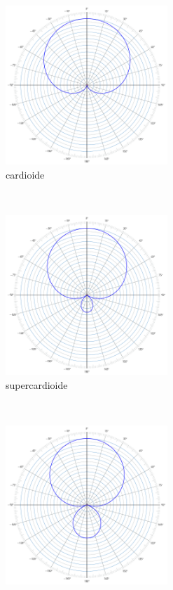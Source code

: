 \begin{figure}[h]
\begin{subfigure}[t]{0.48\textwidth}
        \label{pol:sub-p}
    \end{subfigure}
    \\
    \begin{subfigure}[t]{0.48\textwidth}
        \centering
        \includegraphics[height=6cm]{CAPITOLI/_TIKZ/POLAR/cardioid}
        \caption{cardioide}%
        \label{pol:cardio-p}
    \end{subfigure}
    ~
    \begin{subfigure}[t]{0.48\textwidth}
        \centering
        \includegraphics[height=6cm]{CAPITOLI/_TIKZ/POLAR/supercardioid}
        \caption{supercardioide}%
        \label{pol:super-p}
    \end{subfigure}
    \\
    \begin{subfigure}[t]{0.48\textwidth}
        \centering
        \includegraphics[height=6cm]{CAPITOLI/_TIKZ/POLAR/hypercardioid}

\end{subfigure}
\end{figure}
